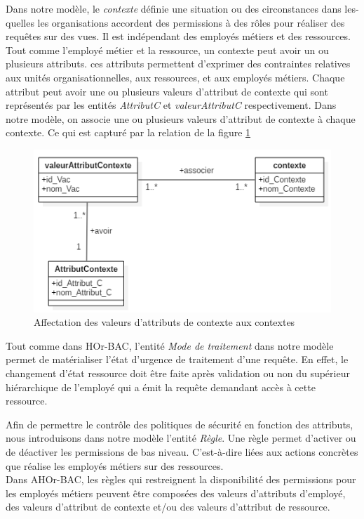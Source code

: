 Dans notre modèle, le \textit{contexte} définie une situation ou des circonstances dans les-quelles les organisations accordent des permissions à des rôles pour réaliser des requêtes sur des vues. Il est indépendant des employés métiers et des ressources. Tout comme l'employé métier et la ressource, un contexte peut avoir un ou plusieurs attributs. ces attributs permettent d'exprimer des contraintes relatives aux unités organisationnelles, aux ressources, et aux employés métiers. Chaque attribut peut avoir une ou plusieurs valeurs d'attribut de contexte qui sont représentés par les entités \textit{AttributC} et \textit{valeurAttributC} respectivement. Dans notre modèle, on associe une ou plusieurs valeurs d'attribut de contexte à chaque contexte. Ce qui est capturé par la relation de la figure \ref{figcontexte}

\begin{figure}[h!]
    \centering
		\includegraphics[scale=0.7]{chap3/images/contexte_Attribut.png}
    \caption{Affectation des valeurs d'attributs de contexte aux contextes}
	 \label{figcontexte}
\end{figure} 

\label{sectionModeTraitement}

Tout comme dans HOr-BAC, l'entité \textit{Mode de traitement} dans notre modèle permet de matérialiser l'état d'urgence de traitement d'une requête. En effet, le changement d'état ressource doit être faite après validation ou non du supérieur hiérarchique de l'employé qui a émit la requête demandant accès à cette ressource.

\label{sectionRègle}

Afin de permettre le contrôle des politiques de sécurité en fonction des attributs, nous introduisons dans notre modèle l'entité \textit{Règle}. Une règle permet d'activer ou de déactiver les permissions de bas niveau. C'est-à-dire liées aux actions concrètes que réalise les employés métiers sur des ressources. \\
\hspace*{0.5cm} Dans AHOr-BAC, les règles qui restreignent la disponibilité des permissions pour les employés métiers peuvent être composées des valeurs d'attributs d'employé, des valeurs d'attribut de contexte et/ou des valeurs d'attribut de ressource.

